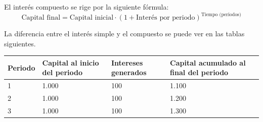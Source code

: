 \documentclass[
]{krantz}
\begin{document}
El interés compuesto se rige por la siguiente fórmula:
\[\mathrm {\text{Capital final} = \text{Capital inicial}·(1+\text{Interés por periodo})^\text{Tiempo (periodos)}}\]

La diferencia entre el interés simple y el compuesto se puede ver en las tablas siguientes.

\begin{longtable}[]{@{}llll@{}}
\toprule
\begin{minipage}[b]{0.19\columnwidth}\raggedright
Periodo\strut
\end{minipage} & \begin{minipage}[b]{0.19\columnwidth}\raggedright
Capital al inicio del periodo\strut
\end{minipage} & \begin{minipage}[b]{0.19\columnwidth}\raggedright
Intereses generados\strut
\end{minipage} & \begin{minipage}[b]{0.32\columnwidth}\raggedright
Capital acumulado al final del periodo\strut
\end{minipage}\tabularnewline
\midrule
\endhead
\begin{minipage}[t]{0.19\columnwidth}\raggedright
1\strut
\end{minipage} & \begin{minipage}[t]{0.19\columnwidth}\raggedright
1.000\strut
\end{minipage} & \begin{minipage}[t]{0.19\columnwidth}\raggedright
100\strut
\end{minipage} & \begin{minipage}[t]{0.32\columnwidth}\raggedright
1.100\strut
\end{minipage}\tabularnewline
\begin{minipage}[t]{0.19\columnwidth}\raggedright
2\strut
\end{minipage} & \begin{minipage}[t]{0.19\columnwidth}\raggedright
1.000\strut
\end{minipage} & \begin{minipage}[t]{0.19\columnwidth}\raggedright
100\strut
\end{minipage} & \begin{minipage}[t]{0.32\columnwidth}\raggedright
1.200\strut
\end{minipage}\tabularnewline
\begin{minipage}[t]{0.19\columnwidth}\raggedright
3\strut
\end{minipage} & \begin{minipage}[t]{0.19\columnwidth}\raggedright
1.000\strut
\end{minipage} & \begin{minipage}[t]{0.19\columnwidth}\raggedright
100\strut
\end{minipage} & \begin{minipage}[t]{0.32\columnwidth}\raggedright
1.300\strut
\end{minipage}\tabularnewline
\bottomrule
\end{longtable}
\end{document}
